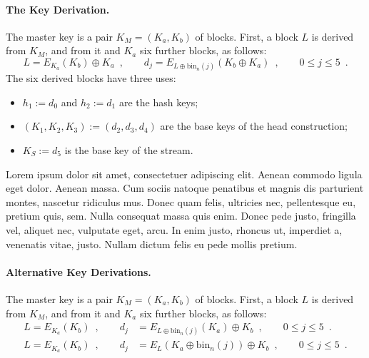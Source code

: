 \documentclass{article}
\begin{document}
\paragraph{The Key Derivation.}
The master key is a pair \(K_M=(K_a,K_b)\) of blocks.
First, a block \(L\) is derived from \(K_M\), and from it and \(K_a\) six further blocks, as follows:
\begin{equation}
\label{eq:key-derivation}
 L=E_{K_a}(K_b)\oplus K_a\enspace,\qquad
 d_j=E_{L\oplus\mathrm{bin}_n(j)}(K_b \oplus K_a)\enspace,\qquad 0\leq j\leq5\enspace.
\end{equation}
The six derived blocks have three uses:
\begin{itemize}
\item \(h_1 := d_0\) and \(h_2 := d_1\) are the hash keys;
\item \((K_1,K_2,K_3) := (d_2,d_3,d_4)\) are the base keys of the head construction;
\item \(K_S := d_5\) is the base key of the stream.
\end{itemize}
Lorem ipsum dolor sit amet, consectetuer adipiscing elit. Aenean commodo ligula
eget dolor. Aenean massa. Cum sociis natoque penatibus et magnis dis parturient
montes, nascetur ridiculus mus. Donec quam felis, ultricies nec, pellentesque
eu, pretium quis, sem. Nulla consequat massa quis enim. Donec pede justo,
fringilla vel, aliquet nec, vulputate eget, arcu. In enim justo, rhoncus ut,
imperdiet a, venenatis vitae, justo. Nullam dictum felis eu pede mollis pretium.


\newenvironment{colorthis}[1]{\color{#1}}{\ignorespacesafterend}

\paragraph{Alternative Key Derivations.}
The master key is a pair \(K_M=(K_a,K_b)\) of blocks.
First, a block \(L\) is derived from \(K_M\), and from it and \(K_a\) six further blocks, as follows:
\begin{align}
\label{eq:key-derivation-2}
L=E_{K_a}(K_b)\enspace,\qquad
 d_j&=E_{L\oplus\mathrm{bin}_n(j)}(K_a)\oplus K_b\enspace,\qquad 0\leq j\leq5\enspace. \\
 \label{eq:key-derivation-3}
 L=E_{K_a}(K_b)\enspace,\qquad
 d_j&=E_{L}(K_a \oplus\mathrm{bin}_n(j))\oplus K_b\enspace,\qquad 0\leq j\leq5\enspace.
\end{align}
\end{document}
